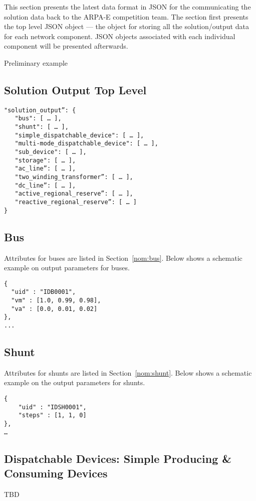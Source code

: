 \label{sec:solution_format}
This section presents the latest data format in JSON for the 
communicating the solution data back to the ARPA-E competition team.
The section first presents the top level JSON object --- the
object for storing all the solution/output data 
for each network component.
JSON objects associated with each individual component will be presented afterwards.

\begin{todo}[]{}
Preliminary example
\end{todo}

\subsection{Solution Output Top Level}
\label{sec:output_data}

\begin{verbatim}
"solution_output”: {
   "bus": [ … ],
   "shunt": [ … ],
   "simple_dispatchable_device": [ … ],
   "multi-mode_dispatchable_device": [ … ],
   "sub_device": [ … ],
   "storage": [ … ],
   "ac_line”: [ … ],
   "two_winding_transformer”: [ … ],
   "dc_line”: [ … ],   
   "active_regional_reserve”: [ … ],
   "reactive_regional_reserve”: [ … ]
}    
\end{verbatim}

\subsection{Bus}
Attributes for buses are listed in Section~\ref{nom:bus}.
Below shows a schematic example on output parameters for buses.
\begin{verbatim}
{
  "uid" : "IDB0001",
  "vm" : [1.0, 0.99, 0.98],
  "va" : [0.0, 0.01, 0.02]
},
...
\end{verbatim}

\subsection{Shunt}
Attributes for shunts are listed in Section~\ref{nom:shunt}.
Below shows a schematic example on the output parameters for shunts.
\begin{verbatim}
{
    "uid" : "IDSH0001",
    "steps" : [1, 1, 0]
},
…    
\end{verbatim}

\subsection{Dispatchable Devices: Simple Producing \& Consuming Devices}
\begin{todo}[]{}
TBD
\end{todo}

